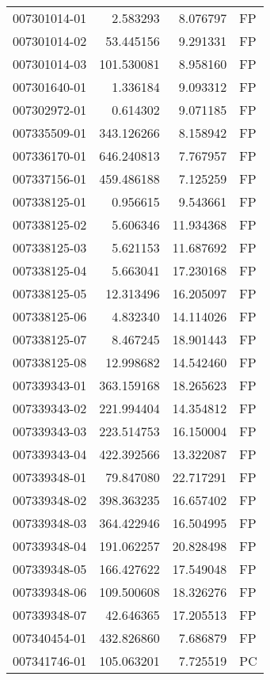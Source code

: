 \begin{tabular}{lrrl}
007301014-01 &    2.583293 &     8.076797 &   FP \\
007301014-02 &   53.445156 &     9.291331 &   FP \\
007301014-03 &  101.530081 &     8.958160 &   FP \\
007301640-01 &    1.336184 &     9.093312 &   FP \\
007302972-01 &    0.614302 &     9.071185 &   FP \\
007335509-01 &  343.126266 &     8.158942 &   FP \\
007336170-01 &  646.240813 &     7.767957 &   FP \\
007337156-01 &  459.486188 &     7.125259 &   FP \\
007338125-01 &    0.956615 &     9.543661 &   FP \\
007338125-02 &    5.606346 &    11.934368 &   FP \\
007338125-03 &    5.621153 &    11.687692 &   FP \\
007338125-04 &    5.663041 &    17.230168 &   FP \\
007338125-05 &   12.313496 &    16.205097 &   FP \\
007338125-06 &    4.832340 &    14.114026 &   FP \\
007338125-07 &    8.467245 &    18.901443 &   FP \\
007338125-08 &   12.998682 &    14.542460 &   FP \\
007339343-01 &  363.159168 &    18.265623 &   FP \\
007339343-02 &  221.994404 &    14.354812 &   FP \\
007339343-03 &  223.514753 &    16.150004 &   FP \\
007339343-04 &  422.392566 &    13.322087 &   FP \\
007339348-01 &   79.847080 &    22.717291 &   FP \\
007339348-02 &  398.363235 &    16.657402 &   FP \\
007339348-03 &  364.422946 &    16.504995 &   FP \\
007339348-04 &  191.062257 &    20.828498 &   FP \\
007339348-05 &  166.427622 &    17.549048 &   FP \\
007339348-06 &  109.500608 &    18.326276 &   FP \\
007339348-07 &   42.646365 &    17.205513 &   FP \\
007340454-01 &  432.826860 &     7.686879 &   FP \\
007341746-01 &  105.063201 &     7.725519 &   PC \\

\end{tabular}
